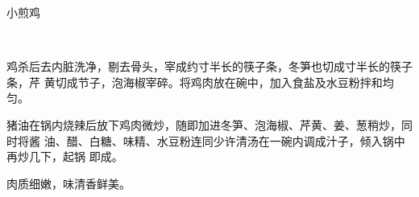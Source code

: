 \begin{recipe}{小煎鸡}

\ingredients

\\

\preparation

鸡杀后去内脏洗净，剔去骨头，宰成约寸半长的筷子条，冬笋也切成寸半长的筷子条，芹
黄切成节子，泡海椒宰碎。将鸡肉放在碗中，加入食盐及水豆粉拌和均匀。

猪油在锅内烧辣后放下鸡肉微炒，随即加进冬笋、泡海椒、芹黄、姜、葱稍炒，同时将酱
油、醋、白糖、味精、水豆粉连同少许清汤在一碗内调成汁子，倾入锅中再炒几下，起锅
即成。

\features

肉质细嫩，味清香鲜美。

\end{recipe}

